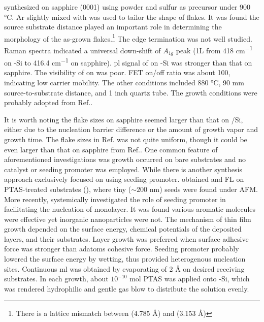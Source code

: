 \citeauthor{Zhang2013h} synthesized  on sapphire (0001) using  powder and sulfur as precursor under 900 \si{\degreeCelsius}.\cite{Zhang2013h} Ar slightly mixed with  was used to tailor the shape of  flakes. It was found the source substrate distance played an important role in determining the morphology of the as-grown flakes.\footnote{There is a lattice mismatch between  (4.785 \si{\angstrom}) and  (3.153 \si{\angstrom})} The edge termination was not well studied. Raman spectra indicated a universal down-shift of $A_{1g}$ peak (1L from 418 \si{cm^{-1}} on -Si to 416.4 \si{cm^{-1}} on sapphire). \gls{pl} signal of  on -Si was stronger than that on sapphire. The visibility of  on  was poor. FET on/off ratio was about 100, indicating low carrier mobility. The other conditions included 880 \si{\degreeCelsius}, 90 mm source-to-substrate distance, and 1 inch quartz tube. The growth conditions were probably adopted from Ref.\cite{Huanga2013}.

It is worth noting the flake sizes on sapphire\cite{Zhang2013h} seemed larger than that on /Si,\cite{Peimyoo2013} either due to the nucleation barrier difference or the amount of growth vapor and growth time. The flake sizes in Ref.\cite{Cong2013} was not quite uniform, though it could be even larger than that on sapphire from Ref.\cite{Zhang2013h}. One common feature of aforementioned investigations was growth occurred on bare substrates and no catalyst or seeding promoter was employed. While there is another synthesis approach\cite{Lee2013,Ling2014} exclusively focused on using seeding promoter. \citeauthor{Lee2013} obtained  and  FL on PTAS-treated substrates (), where tiny ($\sim 200$ nm) seeds were found under AFM. More recently, \citeauthor{Ling2014} systemically investigated the role of seeding promoter in facilitating the nucleation of  monolayer.\cite{Ling2014} It was found various aromatic molecules were effective yet inorganic nanoparticles were not. The mechanism of thin film growth depended on the surface energy, chemical potentials of the deposited layers, and their substrates. Layer growth was preferred when surface adhesive force was stronger than adatoms cohesive force. Seeding promoter probably lowered the surface energy by wetting, thus provided heterogenous nucleation sites. Continuous  \gls{ml} was obtained by evaporating  of 2 \si{\angstrom} on desired receiving substrates. In each growth, about $10^{-10}$ mol PTAS was applied onto -Si, which was rendered hydrophilic and gentle gas blow to distribute the solution evenly.

